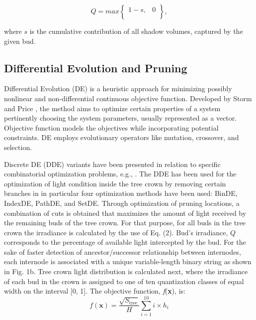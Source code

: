 \documentclass[1p]{elsarticle}
\begin{document}
\begin{equation}
  Q = max\begin{Bmatrix}
1 - s, & 0 \\
\end{Bmatrix},  
\end{equation}

where \(s\) is the cumulative contribution of all shadow volumes,
captured by the given bud.

\subsection{Differential Evolution and Pruning}

Differential Evolution (DE) is a heuristic approach for minimizing
possibly nonlinear and non-differential continuous objective function.
Developed by Storm and Price \cite{storn_differential_1997}, the method aims to optimize
certain properties of a system pertinently choosing the system
parameters, usually represented as a vector. Objective function models
the objectives while incorporating potential constraints. DE employs
evolutionary operators like mutation, crossover, and selection.

Discrete DE (DDE) variants have been presented in relation to specific
combinatorial optimization problems, e.g., \cite{davendra_flow_2009,pan_discrete_2008,wang_novel_2010}. The DDE has
been used for the optimization of light condition inside the tree crown
by removing certain branches in \cite{strnad_novel_2017} in particular four optimization
methods have been used: BinDE, IndexDE, PathDE, and SetDE. Through
optimization of pruning locations, a combination of cuts is obtained
that maximizes the amount of light received by the remaining buds of the
tree crown. For that purpose, for all buds in the tree crown the
irradiance is calculated by the use of Eq. (2). Bud's irradiance, \(Q\)
corresponds to the percentage of available light intercepted by the bud.
For the sake of faster detection of ancestor/successor relationship
between internodes, each internode is associated with a unique
variable-length binary string as shown in Fig. 1b. Tree crown light
distribution is calculated next, where the irradiance of each bud in the
crown is assigned to one of ten quantization classes of equal width on
the interval {[}0, 1{]}. The objective function, \emph{f}(\textbf{x}),
is:
\begin{equation}
 f\left( \mathbf{x} \right) = \frac{\sqrt{S_{\mathrm{\text{tree}}}}}{H}\sum_{i = 1}^{10}{i \times h_{i}}   
\end{equation}
\end{document}
